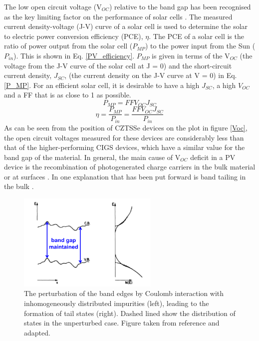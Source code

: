 \documentclass[11pt, twoside]{report}
\begin{document}
The low open circuit voltage (V$_{OC}$) relative to the band gap has been recognised as the key limiting factor on the performance of {\CZTS} solar cells \cite{culprit}. 
The measured current density-voltage (J-V) curve of a solar cell is used to determine the solar to electric power conversion efficiency (PCE), $\eta$. The PCE of a solar cell is the ratio of power output from the solar cell ($P_{MP}$) to the power input from the Sun ($P_{in}$). This is shown in Eq. \ref{PV_efficiency}. $P_{MP}$ is given in terms of the V$_{OC}$ (the voltage from the J-V curve of the solar cell at J = 0) and the short-circuit current density, $J_{SC}$, (the current density on the J-V curve at V = 0) in Eq. \ref{P_MP}.
For an efficient solar cell, it is desirable to have a high $J_{SC}$, a high $V_{OC}$ and a FF that is as close to 1 as possible.
\begin{equation} \label{P_MP}
P_{MP} = FFV_{OC}J_{SC}
\end{equation}
\begin{equation} \label{PV_efficiency}
\eta = \frac{P_{MP}}{P_{in}} = \frac{FFV_{OC}J_{SC}}{P_{in}}
\end{equation}
As can be seen from the position of CZTSSe devices on the plot in figure \ref{Voc}, the open circuit voltages measured for these devices are considerably less than that of the higher-performing CIGS devices, which have a similar value for the band gap of the material.
In general, the main cause of V$_{OC}$ deficit in a PV device is the recombination of photogenerated charge carriers in the bulk material or at surfaces \cite{culprit}. In {\CZTS} one explanation that has been put forward is band tailing in the bulk \cite{band_tail}.


\begin{figure}[h!]
  \centering
    \includegraphics[width=0.6\textwidth]{figures/pankove_elec_fluc.png}
    \caption{The perturbation of the band edges by Coulomb interaction with inhomogeneously distributed impurities (left), leading to the formation of tail states (right). Dashed lined show the distribution of states in the unperturbed case. Figure taken from reference  and adapted.}
  \label{pankove_elec_fluc}
\end{figure}
\end{document}
